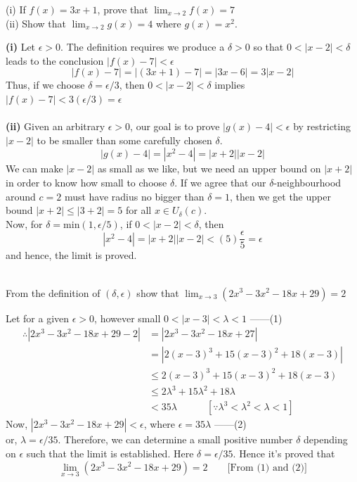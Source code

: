 \documentclass[12pt]{article}
\begin{document}
\begin{example}{(i) If $f(x) = 3x+1$, prove that $ \lim_{x \to 2} f(x) = 7 $ \\
    (ii) Show that $\lim_{x \to 2} g(x) = 4$ where $g(x)=x^2$.}

    \textbf{(i)} Let $\epsilon>0$. The definition requires we produce a $\delta>0$ so that $0<|x-2|<\delta$ leads to the conclusion $|f(x)-7|<\epsilon$ \[
        |f(x)-7| = |(3x+1)-7| = |3x-6| = 3|x-2|
    \]
    Thus, if we choose $\delta=\epsilon/3$, then $0<|x-2|<\delta$ implies $|f(x)-7|<3(\epsilon/3)=\epsilon$ \\~\\
    
    \textbf{(ii)} Given an arbitrary $\epsilon>0$, our goal is to prove $|g(x)-4|<\epsilon$ by restricting $| x-2 |$ to be smaller than some carefully chosen $\delta$. \\\[
        |g(x)-4| = |x^2-4| = |x+2||x-2|
    \] We can make $|x-2|$ as small as we like, but we need an upper bound on $|x+2|$ in order to know how small to choose $\delta$. If we agree that our $\delta$-neighbourhood around $c=2$ must have radius no bigger than $\delta=1$, then we get the upper bound $|x+2|\le |3+2|=5$ for all $x\in U_\delta(c)$. \\
    Now, for $\delta=\text{min}(1,\epsilon/5)$, if $0<|x-2|<\delta$, then \[
        |x^2-4| = |x+2||x-2| < (5)\frac{\epsilon}{5} = \epsilon
    \] and hence, the limit is proved. \\~\\
\end{example}

\begin{example}{From the definition of $(\delta,\epsilon)$ show that $\lim_{x \to 3} (2x^3-3x^2-18x+29)=2$}

    Let for a given $\epsilon>0$, however small $0<|x-3|<\lambda<1$ ------(1)
    \begin{align*}
        \therefore |2x^3-3x^2-18x+29 - 2| &= |2x^3-3x^2-18x+27| \\
        &= |2(x-3)^3 + 15(x-3)^2 + 18(x-3)| \\
        &\le 2(x-3)^3 + 15(x-3)^2 + 18(x-3) \\
        &\le 2\lambda^3 + 15\lambda^2 + 18\lambda \\
        &< 35\lambda \quad\quad\quad [ \because \lambda^3<\lambda^2<\lambda<1 ]
    \end{align*}
    Now, $|2x^3-3x^2-18x+29|<\epsilon$, where $\epsilon=35\lambda$ ------(2) \\
    or, $\lambda=\epsilon/35$. Therefore, we can determine a small positive number $\delta$ depending on $\epsilon$ such that the limit is established. Here $\delta=\epsilon/35$. Hence it's proved that \[
        \lim_{x \to 3} (2x^3-3x^2-18x+29) = 2 \quad\quad \text{[From (1) and (2)]}
    \]
\end{example}
\end{document}
